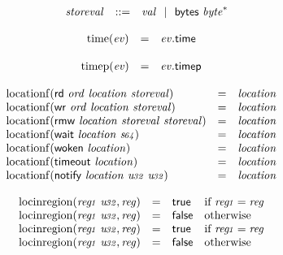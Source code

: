 \vspace{1ex}

$$
\begin{array}[t]{@{}lrrl@{}l@{}}
& {\mathit{storeval}} & ::= & {\mathit{val}} ~~|~~ \mathsf{bytes}~{{\mathit{byte}}^\ast} \\
\end{array}
$$

$$
\begin{array}[t]{@{}lcl@{}l@{}}
{\mathrm{time}}({\mathit{ev}}) & = & {\mathit{ev}}{.}\mathsf{time} \\
\end{array}
$$

$$
\begin{array}[t]{@{}lcl@{}l@{}}
{\mathrm{timep}}({\mathit{ev}}) & = & {\mathit{ev}}{.}\mathsf{timep} \\
\end{array}
$$

$$
\begin{array}[t]{@{}lcl@{}l@{}}
{\mathrm{locationf}}(\mathsf{rd}~{\mathit{ord}}~{\mathit{location}}~{\mathit{storeval}}) & = & {\mathit{location}} \\
{\mathrm{locationf}}(\mathsf{wr}~{\mathit{ord}}~{\mathit{location}}~{\mathit{storeval}}) & = & {\mathit{location}} \\
{\mathrm{locationf}}(\mathsf{rmw}~{\mathit{location}}~{\mathit{storeval}}~{\mathit{storeval}}) & = & {\mathit{location}} \\
{\mathrm{locationf}}(\mathsf{wait}~{\mathit{location}}~{\mathit{s{\kern-0.1em\scriptstyle 64}}}) & = & {\mathit{location}} \\
{\mathrm{locationf}}(\mathsf{woken}~{\mathit{location}}) & = & {\mathit{location}} \\
{\mathrm{locationf}}(\mathsf{timeout}~{\mathit{location}}) & = & {\mathit{location}} \\
{\mathrm{locationf}}(\mathsf{notify}~{\mathit{location}}~{\mathit{u{\kern-0.1em\scriptstyle 32}}}~{\mathit{u{\kern-0.1em\scriptstyle 32}}}) & = & {\mathit{location}} \\
\end{array}
$$

$$
\begin{array}[t]{@{}lcl@{}l@{}}
{\mathrm{locinregion}}({\mathit{reg{\kern-0.1em\scriptstyle 1}}}~{\mathit{u{\kern-0.1em\scriptstyle 32}}}, {\mathit{reg}}) & = & \mathsf{true} & \quad \mbox{if}~ {\mathit{reg{\kern-0.1em\scriptstyle 1}}} = {\mathit{reg}} \\
{\mathrm{locinregion}}({\mathit{reg{\kern-0.1em\scriptstyle 1}}}~{\mathit{u{\kern-0.1em\scriptstyle 32}}}, {\mathit{reg}}) & = & \mathsf{false} & \quad \mbox{otherwise} \\
{\mathrm{locinregion}}({\mathit{reg{\kern-0.1em\scriptstyle 1}}}~{\mathit{u{\kern-0.1em\scriptstyle 32}}}, {\mathit{reg}}) & = & \mathsf{true} & \quad \mbox{if}~ {\mathit{reg{\kern-0.1em\scriptstyle 1}}} = {\mathit{reg}} \\
{\mathrm{locinregion}}({\mathit{reg{\kern-0.1em\scriptstyle 1}}}~{\mathit{u{\kern-0.1em\scriptstyle 32}}}, {\mathit{reg}}) & = & \mathsf{false} & \quad \mbox{otherwise} \\
\end{array}
$$

